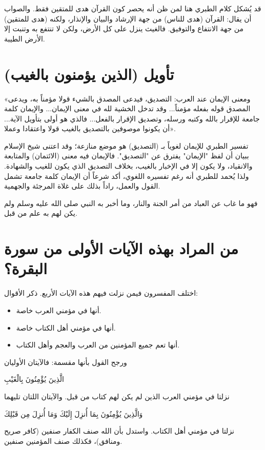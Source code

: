 \begin{fawaid}
قد يُشكل كلام الطبري هنا لمن ظن أنه يحصر كون القرآن هدى للمتقين فقط. والصواب أن يقال: القرآن (هدى للناس) من جهة الإرشاد والبيان والإنذار، ولكنه (هدى للمتقين) من جهة الانتفاع والتوفيق. فالغيث ينزل على كل الأرض، ولكن لا تنتفع به وتنبت إلا الأرض الطيبة.
\end{fawaid}

\separator

\section{تأويل (الذين يؤمنون بالغيب)}
 «ومعنى الإيمان عند العرب: التصديق، فيدعى المصدق بالشيء قولا مؤمناً به، ويدعى المصدق قوله بفعله مؤمناً... وقد تدخل الخشية لله في معنى الإيمان... والإيمان كلمة جامعة للإقرار بالله وكتبه ورسله، وتصديق الإقرار بالفعل... فالذي هو أولى بتأويل الآية... أن يكونوا موصوفين بالتصديق بالغيب قولا واعتقادا وعملا».

\begin{fawaid}
تفسير الطبري للإيمان لغوياً بـ (التصديق) هو موضع منازعة؛ وقد اعتنى شيخ الإسلام  ببيان أن لفظ "الإيمان" يفترق عن "التصديق". فالإيمان فيه معنى (الائتمان) والمتابعة والانقياد، ولا يكون إلا في الإخبار بالغيب، بخلاف التصديق الذي يكون للغيب والشهادة. ولذا يُحمد للطبري أنه رغم تفسيره اللغوي، أكد شرعاً أن الإيمان كلمة جامعة تشمل القول والعمل، راداً بذلك على غلاة المرجئة والجهمية.
\end{fawaid}

 فهو ما غاب عن العباد من أمر الجنة والنار، وما أخبر به النبي صلى الله عليه وسلم ولم يكن لهم به علم من قبل.

\separator

\section{من المراد بهذه الآيات الأولى من سورة البقرة؟}
اختلف المفسرون فيمن نزلت فيهم هذه الآيات الأربع. 
ذكر  الأقوال:
\begin{itemize}
    \item أنها في مؤمني العرب خاصة.
    \item أنها في مؤمني أهل الكتاب خاصة.
    \item أنها تعم جميع المؤمنين من العرب والعجم وأهل الكتاب.
\end{itemize}
ورجح  القول بأنها مقسمة: فالآيتان الأوليان \begin{ayah}الَّذِينَ يُؤْمِنُونَ بِالْغَيْبِ\end{ayah} نزلتا في مؤمني العرب الذين لم يكن لهم كتاب من قبل. والآيتان اللتان تليهما \begin{ayah}وَالَّذِينَ يُؤْمِنُونَ بِمَا أُنزِلَ إِلَيْكَ وَمَا أُنزِلَ مِن قَبْلِكَ\end{ayah} نزلتا في مؤمني أهل الكتاب. واستدل بأن الله صنف الكفار صنفين (كافر صريح ومنافق)، فكذلك صنف المؤمنين صنفين.

